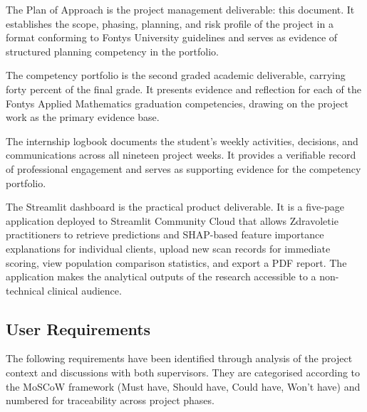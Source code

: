 \documentclass[11pt,a4paper]{article}
\begin{document}
The Plan of Approach is the project management deliverable: this document. It establishes the scope, phasing, planning, and risk profile of the project in a format conforming to Fontys University guidelines and serves as evidence of structured planning competency in the portfolio.

The competency portfolio is the second graded academic deliverable, carrying forty percent of the final grade. It presents evidence and reflection for each of the Fontys Applied Mathematics graduation competencies, drawing on the project work as the primary evidence base.

The internship logbook documents the student's weekly activities, decisions, and communications across all nineteen project weeks. It provides a verifiable record of professional engagement and serves as supporting evidence for the competency portfolio.

The Streamlit dashboard is the practical product deliverable. It is a five-page application deployed to Streamlit Community Cloud that allows Zdravoletie practitioners to retrieve predictions and SHAP-based feature importance explanations for individual clients, upload new scan records for immediate scoring, view population comparison statistics, and export a PDF report. The application makes the analytical outputs of the research accessible to a non-technical clinical audience.

\subsection{User Requirements}

The following requirements have been identified through analysis of the project context and discussions with both supervisors. They are categorised according to the MoSCoW framework (Must have, Should have, Could have, Won't have) and numbered for traceability across project phases.
\end{document}
